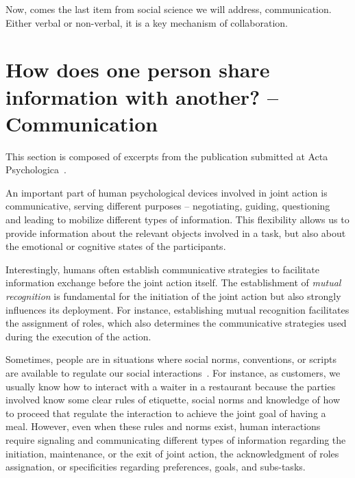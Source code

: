 \documentclass[a4paper,11pt,twoside]{StyleThese}
\begin{document}
Now, comes the last item from social science we will address, communication. Either verbal or non-verbal, it is a key mechanism of collaboration.

\section{How does one person share information with another? -- Communication}\label{chap1:sec:comm}

This section is composed of excerpts from the publication submitted at Acta Psychologica~\citep{belhassein_2021_adressing}.

An important part of human psychological devices involved in joint action is communicative, serving different purposes – \eg negotiating, guiding, questioning~\citep{austin_1962_how, clark_1992_arenas, sperber_1995_relevance} and leading to mobilize different types of information. This flexibility allows us to provide information about the relevant objects involved in a task, but also about the emotional or cognitive states of the participants. 

Interestingly, humans often establish communicative strategies to facilitate information exchange before the joint action itself. The establishment of \emph{mutual recognition} is fundamental for the initiation of the joint action but also strongly influences its deployment. For instance, establishing mutual recognition facilitates the assignment of roles, which also determines the communicative strategies used during the execution of the action. 

Sometimes, people are in situations where social norms, conventions, or scripts are available to regulate our social interactions~\citep{schank_1977_scripts,andrews_2012_apes, castro_2020_social}. For instance, as customers, we usually know how to interact with a waiter in a restaurant because the parties involved know some clear rules of etiquette, social norms and knowledge of how to proceed that regulate the interaction to achieve the joint goal of having a meal. However, even when these rules and norms exist, human interactions require signaling and communicating different types of information regarding the initiation, maintenance, or the exit of joint action, the acknowledgment of roles assignation, or specificities regarding preferences, goals, and subs-tasks. 
\end{document}
